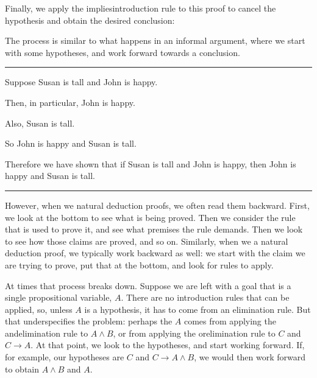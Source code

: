 \documentclass[letterpaper,10pt,english]{sphinxmanual}
\begin{document}
\begin{center}
\DP
\end{center}

\sphinxAtStartPar
Finally, we apply the implies\sphinxhyphen{}introduction rule to this proof to cancel the hypothesis and obtain the desired conclusion:



\begin{center}
\AXM{}
\AXM{}
\DP
\end{center}

\sphinxAtStartPar
The process is similar to what happens in an informal argument, where we start with some hypotheses, and work forward towards a conclusion.


\bigskip\hrule\bigskip


\sphinxAtStartPar
Suppose Susan is tall and John is happy.

\sphinxAtStartPar
Then, in particular, John is happy.

\sphinxAtStartPar
Also, Susan is tall.

\sphinxAtStartPar
So John is happy and Susan is tall.

\sphinxAtStartPar
Therefore we have shown that if Susan is tall and John is happy, then John is happy and Susan is tall.


\bigskip\hrule\bigskip


\sphinxAtStartPar
However, when we  natural deduction proofs, we often read them backward. First, we look at the bottom to see what is being proved. Then we consider the rule that is used to prove it, and see what premises the rule demands. Then we look to see how those claims are proved, and so on. Similarly, when we  a natural deduction proof, we typically work backward as well: we start with the claim we are trying to prove, put that at the bottom, and look for rules to apply.

\sphinxAtStartPar
At times that process breaks down. Suppose we are left with a goal that is a single propositional variable, \(A\). There are no introduction rules that can be applied, so, unless \(A\) is a hypothesis, it has to come from an elimination rule. But that underspecifies the problem: perhaps the \(A\) comes from applying the and\sphinxhyphen{}elimination rule to \(A \wedge B\), or from applying the or\sphinxhyphen{}elimination rule to \(C\) and \(C \to A\). At that point, we look to the hypotheses, and start working forward. If, for example, our hypotheses are \(C\) and \(C \to A \wedge B\), we would then work forward to obtain \(A \wedge B\) and \(A\).
\end{document}
